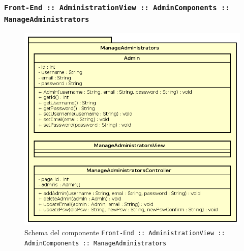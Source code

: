 \documentclass[../DefinizioneDiProdotto.tex]{subfiles}
\begin{document}
	\subsubsection{ \texttt{Front-End :: AdministrationView :: AdminComponents :: ManageAdministrators}}
		\begin{figure}[!h]
			\centering
			\includegraphics[scale=0.7]{Architettura/Front-End/Administration/AdminComponents/ManageAdministrators.png}
			\caption{Schema del componente \texttt{Front-End :: AdministrationView :: AdminComponents :: ManageAdministrators}}
		\end{figure}
\end{document}
